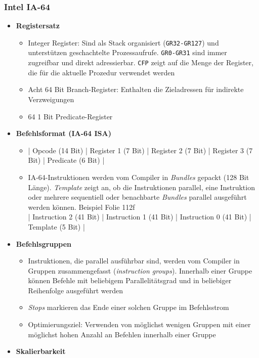 \subsubsection{Intel IA-64}
\begin{itemize}
	\item \textbf{Registersatz}
	\begin{itemize}
		\item Integer Register: Sind als Stack organisiert (\texttt{GR32-GR127}) und unterstützen geschachtelte Prozessaufrufe. \texttt{GR0-GR31} sind immer zugreifbar und direkt adressierbar. \texttt{CFP} zeigt auf die Menge der Register, die für die aktuelle Prozedur verwendet werden
		\item Acht 64 Bit Branch-Register: Enthalten die Zieladressen für indirekte Verzweigungen
		\item 64 1 Bit Predicate-Register
	\end{itemize}
	\item \textbf{Befehlsformat (IA-64 ISA)}
	\begin{itemize}
		\item | Opcode (14 Bit) | Register 1 (7 Bit) | Register 2 (7 Bit) | Register 3 (7 Bit) | Predicate (6 Bit) |
		\item IA-64-Instruktionen werden vom Compiler in \textit{Bundles} gepackt (128 Bit Länge). \textit{Template} zeigt an, ob die Instruktionen parallel, eine Instruktion oder mehrere sequentiell oder benachbarte \textit{Bundles} parallel ausgeführt werden können. Beispiel Folie 112f \\ | Instruction 2 (41 Bit) | Instruction 1 (41 Bit) | Instruction 0 (41 Bit) | Template (5 Bit) |
	\end{itemize}
	\item \textbf{Befehlsgruppen}
	\begin{itemize}
		\item Instruktionen, die parallel ausführbar sind, werden vom Compiler in Gruppen zusammengefasst (\textit{instruction groups}). Innerhalb einer Gruppe können Befehle mit beliebigem Parallelitätsgrad und in beliebiger Reihenfolge ausgeführt werden
		\item \textit{Stops} markieren das Ende einer solchen Gruppe im Befehlsstrom
		\item Optimierungsziel: Verwenden von möglichst wenigen Gruppen mit einer möglichst hohen Anzahl an Befehlen innerhalb einer Gruppe
	\end{itemize}
	\item \textbf{Skalierbarkeit}
	\begin{itemize}

\end{itemize}
\end{itemize}
